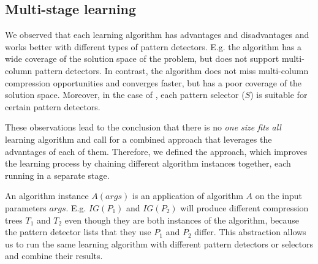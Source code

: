 \subsection{Multi-stage learning}
\label{sub:learning:multistage}




% 

\iffalse
\begin{verbatim}
- separate pattern detectors into groups (stages) based on rules that determine which patterns work good together
- use different pattern selector for each group
- instead of putting all the patterns together with only one selector
- each stage can take either the iterative approach or the recursive one
\end{verbatim}
\fi

We observed that each learning algorithm has advantages and disadvantages and works better with different types of pattern detectors. E.g. the  algorithm has a wide coverage of the solution space of the problem, but does not support multi-column pattern detectors. In contrast, the  algorithm does not miss multi-column compression opportunities and converges faster, but has a poor coverage of the solution space. Moreover, in the case of , each pattern selector (\(S\)) is suitable for certain pattern detectors.

These observations lead to the conclusion that there is no \textit{one size fits all} learning algorithm and call for a combined approach that leverages the advantages of each of them. Therefore, we defined the  approach, which improves the learning process by chaining different algorithm instances together, each running in a separate stage.

An algorithm instance \(A(\mathit{args})\) is an application of algorithm \(A\) on the input parameters \(\mathit{args}\). E.g. \(\mathit{IG}(P_{1})\) and \(\mathit{IG}(P_{2})\) will produce different compression trees \(T_{1}\) and \(T_{2}\) even though they are both instances of the  algorithm, because the pattern detector lists that they use \(P_{1}\) and \(P_{2}\) differ. This abstraction allows us to run the same learning algorithm with different pattern detectors or selectors and combine their results.

